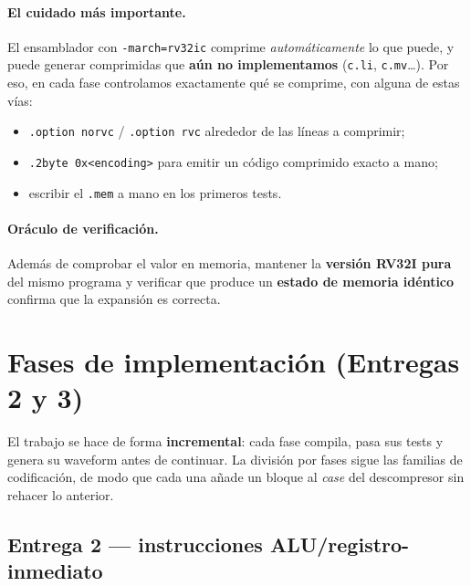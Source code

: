 \documentclass[11pt]{article}
\newcommand{\code}[1]{\texttt{#1}}
\begin{document}
\paragraph{El cuidado más importante.} El ensamblador con \code{-march=rv32ic}
comprime \emph{automáticamente} lo que puede, y puede generar comprimidas que
\textbf{aún no implementamos} (\code{c.li}, \code{c.mv}\dots). Por eso, en cada
fase controlamos exactamente qué se comprime, con alguna de estas vías:
\begin{itemize}[noitemsep, leftmargin=1.6em]
  \item \code{.option norvc} / \code{.option rvc} alrededor de las líneas a comprimir;
  \item \code{.2byte 0x<encoding>} para emitir un código comprimido exacto a mano;
  \item escribir el \code{.mem} a mano en los primeros tests.
\end{itemize}

\paragraph{Oráculo de verificación.} Además de comprobar el valor en memoria,
mantener la \textbf{versión RV32I pura} del mismo programa y verificar que produce
un \textbf{estado de memoria idéntico} confirma que la expansión es correcta.

\section{Fases de implementación (Entregas 2 y 3)}

El trabajo se hace de forma \textbf{incremental}: cada fase compila, pasa sus
tests y genera su waveform antes de continuar. La división por fases sigue las
familias de codificación, de modo que cada una añade un bloque al \emph{case} del
descompresor sin rehacer lo anterior.

\subsection{Entrega 2 --- instrucciones ALU/registro-inmediato}
\end{document}
